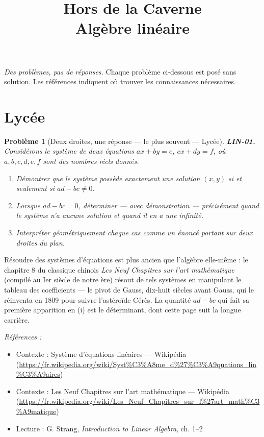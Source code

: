 \documentclass[11pt]{article}
\title{Hors de la Caverne \\ \Large Algèbre linéaire}
\author{}
\date{}
\newtheorem{problem}{Problème}
\newenvironment{refs}{\par\small\noindent\emph{Références :}\begin{itemize}\setlength\itemsep{0pt}}{\end{itemize}\normalsize}
\begin{document}
\maketitle
\noindent\emph{Des problèmes, pas de réponses.} Chaque problème ci-dessous est posé
sans solution. Les références indiquent où trouver les connaissances nécessaires.
\medskip


\section*{Lycée}

\begin{problem}[{Deux droites, une réponse --- le plus souvent --- Lycée}]
\textbf{LIN-01.} Considérons le système de deux équations
$ax + by = e$, $cx + dy = f$, où $a, b, c, d, e, f$ sont des nombres réels donnés.
\begin{enumerate}
\item[(i)] Démontrer que le système possède exactement une solution $(x, y)$ si et seulement si
$ad - bc \ne 0$.
\item[(ii)] Lorsque $ad - bc = 0$, déterminer --- avec démonstration --- précisément quand le système
n'a aucune solution et quand il en a une infinité.
\item[(iii)] Interpréter géométriquement chaque cas comme un
énoncé portant sur deux droites du plan.
\end{enumerate}

\end{problem}

\noindent Résoudre des systèmes d'équations est plus ancien que l'algèbre elle-même : le
chapitre 8 du classique chinois \textit{Les Neuf Chapitres sur l'art mathématique} (compilé au
Ier siècle de notre ère) résout de tels systèmes en manipulant le tableau des
coefficients --- le pivot de Gauss, dix-huit siècles avant Gauss, qui le réinventa en 1809 pour
suivre l'astéroïde Cérès. La quantité $ad - bc$ qui fait sa première apparition en (i) est le
déterminant, dont cette page suit la longue carrière.

\begin{refs}
\item Contexte : Système d'équations linéaires --- Wikipédia (\url{https://fr.wikipedia.org/wiki/Syst%C3%A8me_d%27%C3%A9quations_lin%C3%A9aires})
\item Contexte : Les Neuf Chapitres sur l'art mathématique --- Wikipédia (\url{https://fr.wikipedia.org/wiki/Les_Neuf_Chapitres_sur_l%27art_math%C3%A9matique})
\item Lecture : G. Strang, \textit{Introduction to Linear Algebra}, ch. 1--2
\end{refs}
\end{document}

